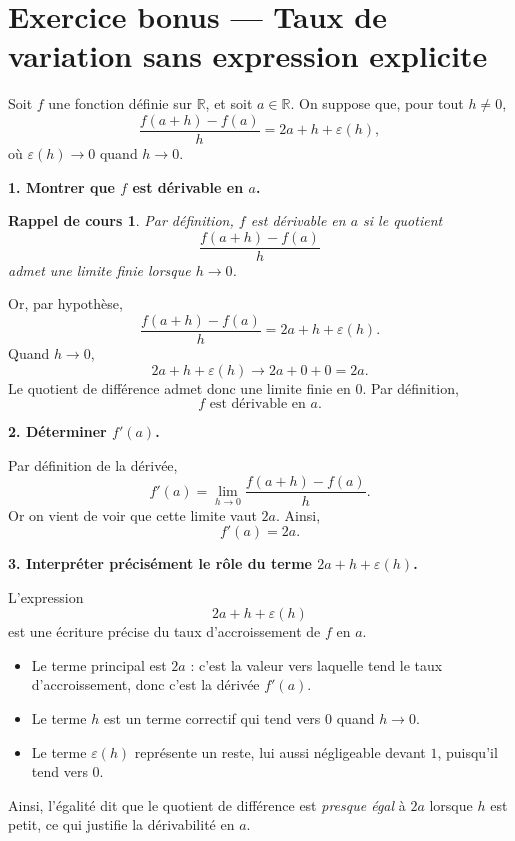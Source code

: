 \documentclass[11pt,a4paper]{article}
\newtheorem*{rappel}{Rappel de cours}
\newcommand{\R}{\mathbb{R}}
\begin{document}
\bigskip

\section*{Exercice bonus --- Taux de variation sans expression explicite}

Soit \(f\) une fonction définie sur \(\R\), et soit \(a\in\R\). On suppose que, pour tout \(h\neq 0\),
\[
\frac{f(a+h)-f(a)}{h}=2a+h+\varepsilon(h),
\]
où \(\varepsilon(h)\to 0\) quand \(h\to 0\).

\textbf{1. Montrer que \(f\) est dérivable en \(a\).}

\begin{rappel}
Par définition, \(f\) est dérivable en \(a\) si le quotient
\[
\frac{f(a+h)-f(a)}{h}
\]
admet une limite finie lorsque \(h\to 0\).
\end{rappel}

Or, par hypothèse,
\[
\frac{f(a+h)-f(a)}{h}=2a+h+\varepsilon(h).
\]
Quand \(h\to 0\),
\[
2a+h+\varepsilon(h)\longrightarrow 2a+0+0=2a.
\]
Le quotient de différence admet donc une limite finie en \(0\). Par définition,
\[
\boxed{f \text{ est dérivable en } a.}
\]

\bigskip

\textbf{2. Déterminer \(f'(a)\).}

Par définition de la dérivée,
\[
f'(a)=\lim_{h\to 0}\frac{f(a+h)-f(a)}{h}.
\]
Or on vient de voir que cette limite vaut \(2a\). Ainsi,
\[
\boxed{f'(a)=2a.}
\]

\bigskip

\textbf{3. Interpréter précisément le rôle du terme \(2a+h+\varepsilon(h)\).}

L'expression
\[
2a+h+\varepsilon(h)
\]
est une écriture précise du taux d'accroissement de \(f\) en \(a\).

\begin{itemize}[label=\(\bullet\)]
    \item Le terme principal est \(2a\) : c'est la valeur vers laquelle tend le taux d'accroissement, donc c'est la dérivée \(f'(a)\).
    \item Le terme \(h\) est un terme correctif qui tend vers \(0\) quand \(h\to 0\).
    \item Le terme \(\varepsilon(h)\) représente un reste, lui aussi négligeable devant \(1\), puisqu'il tend vers \(0\).
\end{itemize}

Ainsi, l'égalité dit que le quotient de différence est \emph{presque égal} à \(2a\) lorsque \(h\) est petit, ce qui justifie la dérivabilité en \(a\).
\end{document}
